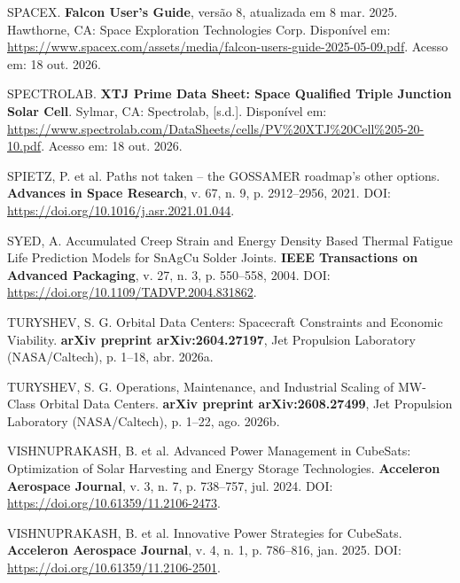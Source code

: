 \vspace{0.2cm}
\noindent SPACEX. \textbf{Falcon User's Guide}, versão 8, atualizada em 8 mar. 2025. Hawthorne, CA: Space Exploration Technologies Corp. Disponível em: \url{https://www.spacex.com/assets/media/falcon-users-guide-2025-05-09.pdf}. Acesso em: 18 out. 2026.

\vspace{0.2cm}
\noindent SPECTROLAB. \textbf{XTJ Prime Data Sheet: Space Qualified Triple Junction Solar Cell}. Sylmar, CA: Spectrolab, [s.d.]. Disponível em: \url{https://www.spectrolab.com/DataSheets/cells/PV%20XTJ%20Cell%205-20-10.pdf}. Acesso em: 18 out. 2026.

\vspace{0.2cm}
\noindent SPIETZ, P. et al. Paths not taken -- the GOSSAMER roadmap's other options. \textbf{Advances in Space Research}, v. 67, n. 9, p. 2912--2956, 2021. DOI: \url{https://doi.org/10.1016/j.asr.2021.01.044}.

\vspace{0.2cm}
\noindent SYED, A. Accumulated Creep Strain and Energy Density Based Thermal Fatigue Life Prediction Models for SnAgCu Solder Joints. \textbf{IEEE Transactions on Advanced Packaging}, v. 27, n. 3, p. 550--558, 2004. DOI: \url{https://doi.org/10.1109/TADVP.2004.831862}.

\vspace{0.2cm}
\noindent TURYSHEV, S. G. Orbital Data Centers: Spacecraft Constraints and Economic Viability. \textbf{arXiv preprint arXiv:2604.27197}, Jet Propulsion Laboratory (NASA/Caltech), p. 1--18, abr. 2026a.

\vspace{0.2cm}
\noindent TURYSHEV, S. G. Operations, Maintenance, and Industrial Scaling of MW-Class Orbital Data Centers. \textbf{arXiv preprint arXiv:2608.27499}, Jet Propulsion Laboratory (NASA/Caltech), p. 1--22, ago. 2026b.

\vspace{0.2cm}
\noindent VISHNUPRAKASH, B. et al. Advanced Power Management in CubeSats: Optimization of Solar Harvesting and Energy Storage Technologies. \textbf{Acceleron Aerospace Journal}, v. 3, n. 7, p. 738--757, jul. 2024. DOI: \url{https://doi.org/10.61359/11.2106-2473}.

\vspace{0.2cm}
\noindent VISHNUPRAKASH, B. et al. Innovative Power Strategies for CubeSats. \textbf{Acceleron Aerospace Journal}, v. 4, n. 1, p. 786--816, jan. 2025. DOI: \url{https://doi.org/10.61359/11.2106-2501}.

